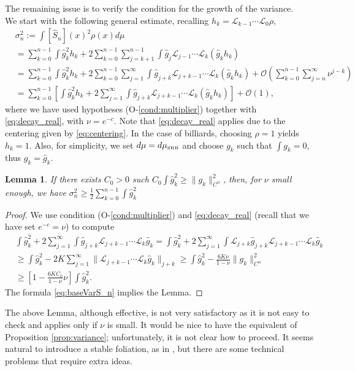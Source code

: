 \documentclass{amsart}
\numberwithin{equation}{section}
\newtheorem{lem}[thm]{Lemma}
\newcommand\cL{{\mathcal L}}
\newcommand\cO{{\mathcal O}}
\newcommand{\musrb}{\mu_{\mbox{\tiny SRB}}}
\begin{document}
The remaining issue is to verify the condition for the growth of the variance. \\
We start with the following general estimate, recalling $h_k = \cL_{k-1}\cdots \cL_0 \rho$,
\begin{equation}\label{eq:baseVarS_n}
\begin{split}
&\sigma_n^2:=\int [\hat S_n](x)^2\rho(x) d \mu\\
&=\sum_{k=0}^{n-1}\int \hat g_k^2 h_k+2\sum_{k=0}^{n-1}\sum_{j=k+1}^{n-1}\int \hat g_j\cL_{j-1}\cdots\cL_k (\hat g_k h_k)\\
&=\sum_{k=0}^{n-1}\int \hat g_k^2 h_k+2\sum_{k=0}^{n-1}\sum_{j=1}^{\infty}\int \hat g_{j+k}\cL_{j+k-1}\cdots\cL_k (\hat g_k h_k)
+\cO\left(\sum_{k=0}^{n-1}\sum_{j=n}^{\infty}\nu^{j-k}\right)\\
&=\sum_{k=0}^{n-1}\left[\int \hat g_k^2 h_k+2\sum_{j=1}^{\infty}\int \hat g_{j+k}\cL_{j+k-1}\cdots\cL_k (\hat g_k h_k) \right]
+\cO(1),
\end{split}
\end{equation}
where we have used  hypotheses (O-\ref{cond:multiplier}) together with \eqref{eq:decay_real}, with $\nu=e^{-c}$. Note that \eqref{eq:decay_real} applies due to the centering given
by \eqref{eq:centering}. 
In the case of billiards, choosing $\rho=1$ yields  $h_k=1$. Also, for simplicity, we 
set $d\mu = d\musrb$ and choose  $g_k$ such that $\int g_k=0$, thus $g_k=\hat g_k$.

\begin{lem}\label{lem:poor-man-growth} 
If there exists $C_0>0$ such  $C_0\int \hat g_k^2 \geq  \|g_k\|_{C^\alpha}^2$, then, for $\nu$ small enough, we have $\sigma_n^2\geq \frac 12\sum_{k=0}^{n-1} \int \hat g_k^2$
\end{lem}
\begin{proof}
We use condition (O-\ref{cond:multiplier}) and \eqref{eq:decay_real} (recall that we have set $e^{-c}=\nu$) to compute
\[
\begin{split}
&\int \hat g_k^2 +2\sum_{j=1}^{\infty}\int \hat g_{j+k}\cL_{j+k-1}\cdots\cL_k \hat g_k=\int \hat g_k^2 +2\sum_{j=1}^{\infty}\int\cL_{j+k} \hat g_{j+k}\cL_{j+k-1}\cdots\cL_k \hat g_k\\
 &\geq \int\hat g_k^2- 2K\sum_{j=1}^{\infty}\|\cL_{j+k-1}\cdots\cL_k \hat g_k\|_{j+k}\geq \int \hat g_k^2 -\frac{6K \nu }{1-\nu}\|g_k\|_{C^\alpha}^2\\
&\geq \left[1-\frac{6K C_0}{1-\nu}\nu\right]\int \hat g_k^2.
\end{split}
\]
The formula \eqref{eq:baseVarS_n} implies the Lemma.
\end{proof}
The above Lemma, although effective, is not very satisfactory as it is not easy to check and applies only if $\nu$ is small. It would be nice to have the equivalent of Proposition \ref{prop:variance}; unfortunately, it is not clear how to proceed. It seems natural to introduce a stable foliation, as in \cite{Li95c}, but there are some technical problems that require extra ideas.
\end{document}

